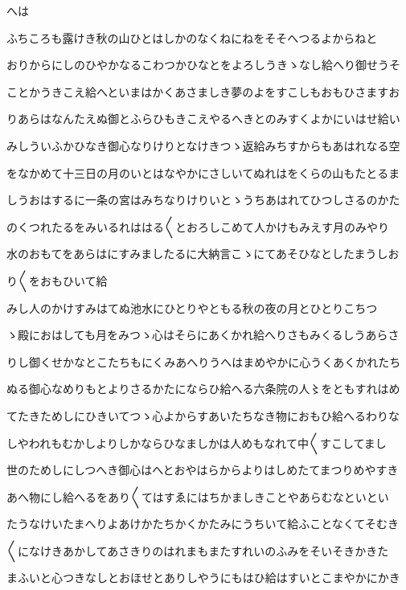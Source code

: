 \documentclass[a4paper,11pt,landscape]{ltjtarticle}
\begin{document}
\par\medskip
へは
\par\medskip
ふちころも露けき秋の山ひとはしかのなくねにねをそそへつるよからねと
\par\medskip
おりからにしのひやかなるこわつかひなとをよろしうきゝなし給へり御せうそ
\par\medskip
ことかうきこえ給へといまはかくあさましき夢のよをすこしもおもひさますお
\par\medskip
りあらはなんたえぬ御とふらひもきこえやるへきとのみすくよかにいはせ給い
\par\medskip
みしういふかひなき御心なりけりとなけきつゝ返給みちすからもあはれなる空
\par\medskip
をなかめて十三日の月のいとはなやかにさしいてぬれはをくらの山もたとるま
\par\medskip
しうおはするに一条の宮はみちなりけりいとゝうちあはれてひつしさるのかた
\par\medskip
のくつれたるをみいるれははる〱とおろしこめて人かけもみえす月のみやり
\par\medskip
水のおもてをあらはにすみましたるに大納言こゝにてあそひなとしたまうしお
\par\medskip
り〱をおもひいて給
\par\medskip
みし人のかけすみはてぬ池水にひとりやともる秋の夜の月とひとりこちつ
\par\medskip
ゝ殿におはしても月をみつゝ心はそらにあくかれ給へりさもみくるしうあらさ
\par\medskip
りし御くせかなとこたちもにくみあへりうへはまめやかに心うくあくかれたち
\par\medskip
ぬる御心なめりもとよりさるかたにならひ給へる六条院の人〻をともすれはめ
\par\medskip
てたきためしにひきいてつゝ心よからすあいたちなき物におもひ給へるわりな
\par\medskip
しやわれもむかしよりしかならひなましかは人めもなれて中〱すこしてまし
\par\medskip
世のためしにしつへき御心はへとおやはらからよりはしめたてまつりめやすき
\par\medskip
あへ物にし給へるをあり〱てはすゑにはちかましきことやあらむなといとい
\par\medskip
たうなけいたまへりよあけかたちかくかたみにうちいて給ふことなくてそむき
\par\medskip
〱になけきあかしてあさきりのはれまもまたすれいのふみをそいそきかきた
\par\medskip
まふいと心つきなしとおほせとありしやうにもはひ給はすいとこまやかにかき
\par\medskip
\end{document}
